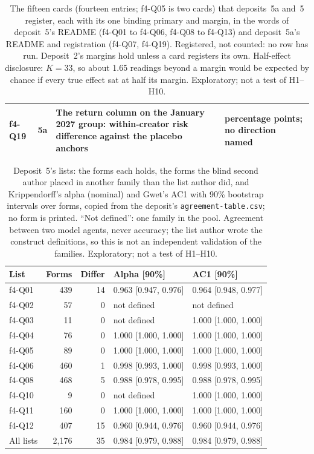 \begin{table}[tp]
\begin{tabular}{@{}>{\raggedright\arraybackslash}p{}>{\raggedright\arraybackslash}p{}p{}>{\raggedright\arraybackslash}p{}@{}}
f4-Q19 & 5a & The return column on the January 2027 group: within-creator risk difference against the placebo anchors & 5
percentage points; no direction named \\
\bottomrule
\end{tabular}
\caption{The fifteen cards (fourteen entries; f4-Q05 is two cards) that deposits~5a and~5 register, each with its one
binding primary and margin, in the words
of deposit~5's README (f4-Q01 to f4-Q06, f4-Q08 to f4-Q13) and deposit~5a's README and registration (f4-Q07, f4-Q19).
Registered, not counted: no row has run. Deposit~2's margins hold unless a card registers its own. Half-effect
disclosure: $K = 33$, so about 1.65 readings beyond a margin would be expected by chance if every true effect sat at half
its margin. Exploratory; not a test of H1--H10. \LabelValidity}
\label{tab:panel4-primaries}
\end{table}

\begin{table}[tp]
\centering
\scriptsize
\setlength{\tabcolsep}{2pt}
\begin{tabular}{@{}lrrll@{}}
\toprule
List & Forms & Differ & Alpha [90\%] & AC1 [90\%] \\
\midrule
f4-Q01 & 439 & 14 & 0.963 [0.947, 0.976] & 0.964 [0.948, 0.977] \\
f4-Q02 & 57 & 0 & not defined & not defined \\
f4-Q03 & 11 & 0 & not defined & 1.000 [1.000, 1.000] \\
f4-Q04 & 76 & 0 & 1.000 [1.000, 1.000] & 1.000 [1.000, 1.000] \\
f4-Q05 & 89 & 0 & 1.000 [1.000, 1.000] & 1.000 [1.000, 1.000] \\
f4-Q06 & 460 & 1 & 0.998 [0.993, 1.000] & 0.998 [0.993, 1.000] \\
f4-Q08 & 468 & 5 & 0.988 [0.978, 0.995] & 0.988 [0.978, 0.995] \\
f4-Q10 & 9 & 0 & not defined & 1.000 [1.000, 1.000] \\
f4-Q11 & 160 & 0 & 1.000 [1.000, 1.000] & 1.000 [1.000, 1.000] \\
f4-Q12 & 407 & 15 & 0.960 [0.944, 0.976] & 0.960 [0.944, 0.976] \\
\midrule
All lists & 2,176 & 35 & 0.984 [0.979, 0.988] & 0.984 [0.979, 0.988] \\
\bottomrule
\end{tabular}
\caption{Deposit~5's lists: the forms each holds, the forms the blind second author placed in another family than the
list author did, and Krippendorff's alpha (nominal) and Gwet's AC1 with 90\% bootstrap intervals over forms, copied from
the deposit's \texttt{agreement-table.csv}; no form is printed. ``Not defined'': one family in the pool. Agreement
between two model agents, never accuracy; the list author wrote the construct definitions, so this is not an independent
validation of the families. Exploratory; not a test of H1--H10.}
\label{tab:panel4-agreement}
\end{table}

